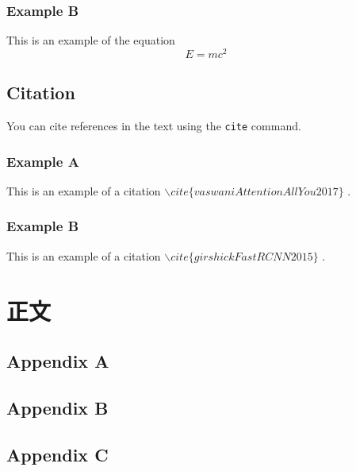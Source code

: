 \documentclass{scnuthesis}
\begin{document}
    \subsection{Example B}
    This is an example of the equation
    \begin{equation}
        E=mc^{2}
    \end{equation}

    \section{Citation}
    You can cite references in the text using the \texttt{cite} command.
    \subsection{Example A}
    This is an example of a citation
    $\backslash cite\{vaswaniAttentionAllYou2017\}$
    \cite{vaswaniAttentionAllYou2017}.
    \subsection{Example B}
    This is an example of a citation $\backslash cite\{girshickFastRCNN2015\}$ \cite{girshickFastRCNN2015}.

    \chapter{正文}

    \appendix
    \section{Appendix A}
    \section{Appendix B}
    \section{Appendix C}

    \acknowledgements
\end{document}

